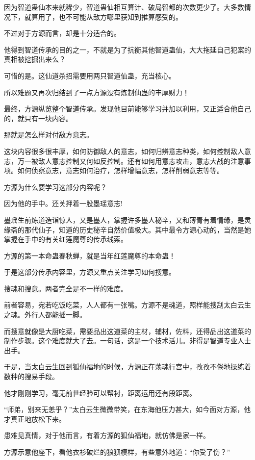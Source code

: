 \begin{this_body}
因为智道蛊仙本来就稀少，智道蛊仙相互算计、破局智都的次数更少了。大多数情况下，就算用了，也不可能从敌方哪里获知到推算感受的。

不过对于方源而言，却是十分适合的。

他得到智道传承的目的之一，不就是为了抗衡其他智道蛊仙，大大拖延自己犯案的真相被挖掘出来么？

可惜的是。这仙道杀招需要用两只智道仙蛊，充当核心。

所以难题又再次归结到了一点方源没有炼制仙蛊的丰厚财力！

最终，方源纵览整个智道传承。发现他目前能够学习并加以利用，又正适合他自己的，就只有一块内容。

那就是怎么样对付敌方意志。

这块内容很多很丰厚，如何防御敌人的意志，如何归辨意志种类，如何控制敌人意志，万一被敌人意志控制又何如反控制。还有如何用意志攻击，意志大战的注意事项。如何侦察意志，意志如何治疗，怎样增幅意志，怎样削弱意志等等。

方源为什么要学习这部分内容呢？

因为他的手中。还关押着一股墨瑶意志!

墨瑶生前炼道造诣惊人，又是墨人，掌握许多墨人秘辛，又和薄青有着情缘，是灵缘斋的那代仙子，知道的历史秘辛自然价值极大。其中最令方源心动的，当然是她掌握在手中的有关红莲魔尊的传承线索。

方源的第一本命蛊春秋蝉，就是当年红莲魔尊的本命蛊！

于是这部分传承内容里，方源又重点关注学习如何搜意。

搜魂和搜意。两者完全是不一样的难度。

前者容易，宛若吃饭吃菜，人人都有一张嘴。方源不是魂道，照样能搜刮太白云生之魂。外行人都能插一脚。

而搜意就像是大厨吃菜，需要品出这道菜的主材，辅材，佐料，还得品出这道菜的制作步骤。这个难度就大了去。一句话，这是一个技术活儿。非得是智道专业人士出手。

于是，当太白云生回到狐仙福地的时候，方源正在荡魂行宫中，孜孜不倦地操练着数种的搜易手段。

他才刚刚学习，毫无前世经验可以帮衬，距离运用还有段距离。

“师弟，别来无恙乎？”太白云生微微带笑，在东海他压力甚大，如今面对方源，他才真正地放松下来。

患难见真情，对于他而言，有着方源的狐仙福地，就仿佛是家一样。

方源示意他座下，看他衣衫破烂的狼狈模样，有些意外地道：“你受了伤？”


\end{this_body}
